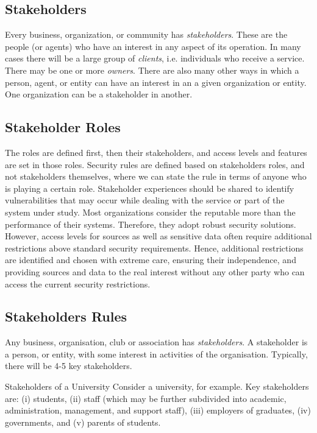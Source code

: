 \subsection{Stakeholders}

Every business, organization, or community has {\em stakeholders}. These are the people (or agents) who have
an interest in any aspect of its operation. In many cases there will be a large group of {\em clients}, i.e. 
individuals who receive a service. There may be one or more {\em owners}. There are also many other ways
in which a person, agent, or entity can have an interest in an a given organization or entity. One organization
can be a stakeholder in another.

\subsection{Stakeholder Roles}\label{strol}
The roles are defined first, then their stakeholders, and access levels and features are set in those roles. Security rules are defined based on stakeholders roles, and not stakeholders themselves, where we can state the rule in terms of anyone who is playing a certain role. Stakeholder experiences should be shared to identify vulnerabilities that may occur while dealing with the service or part of the system under study. Most organizations consider the reputable more than the performance of their systems. Therefore, they adopt robust security solutions. However, access levels for sources as well as sensitive data often require additional restrictions above standard security requirements. Hence,  additional restrictions are identified and chosen with extreme care, ensuring their independence, and providing sources and data to the real interest without any other party who can access the current security restrictions.
\subsection{Stakeholders Rules}

Any business, organisation, club or association has {\em stakeholders}. A stakeholder is a person, or 
entity, with some interest in activities of the organisation. Typically, there will be 4-5 key stakeholders.

\begin{example}{Stakeholders of a University}%
Consider a university, for example. Key stakeholders are: (i) students, (ii) staff (which may be further
subdivided into academic, administration, management, and support staff), (iii) employers of graduates,
(iv) governments, and (v) parents of students.
\end{example}

